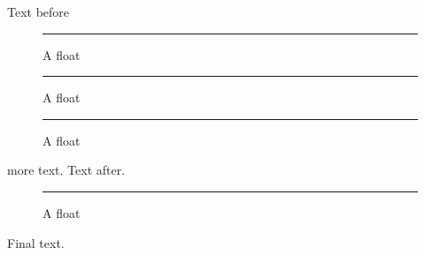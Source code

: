 \documentclass{article}
\newcommand\fig{\begin{figure}[htbp]\centering
  \rule{1cm}{\pdfuniformdeviate 500pt}\caption{A float}\end{figure}}
\begin{document}
Text before \fig\fig\fig more text.\hfill\pagebreak
Text after.
\fig
Final text.
\gdef\SatexReachedEnd{}
\end{document}
